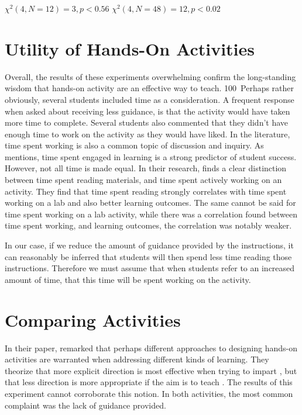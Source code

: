 






$\chi^2(4, N=12)=3, p<0.56$
$\chi^2(4, N=48)=12, p<0.02$






\section{Utility of Hands-On Activities}
    Overall, the results of these experiments overwhelming confirm the long-standing wisdom that hands-on activity are an effective way to teach. %
 100\    
    Perhaps rather obviously, several students included time as a consideration. %
A frequent response when asked about receiving less guidance, is that the activity would have taken more time to complete. %
Several students also commented that they didn't have enough time to work on the activity as they would have liked. %
In the literature, time spent working is also a common topic of discussion and inquiry. %
As \textcite{C-Linehan} mentions, time spent engaged in learning is a strong predictor of student success. %
However, not all time is made equal. In their research, \textcite{Z-Zeng} finds a clear distinction between time spent reading materials, and time spent actively working on an activity. %
They find that time spent reading strongly correlates with time spent working on a lab and also better learning outcomes. %
The same cannot be said for time spent working on a lab activity, while there was a correlation found between time spent working, and learning outcomes, the correlation was notably weaker. 
    
    In our case, if we reduce the amount of guidance provided by the instructions, it can reasonably be inferred that students will then spend less time reading those instructions. %
Therefore we must assume that when students refer to an increased amount of time, that this time will be spent working on the activity. 


\section{Comparing Activities}
    In their paper, \citeauthor{R-Weiss} remarked that perhaps different approaches to designing hands-on activities are warranted when addressing different kinds of learning. %
They theorize that more explicit direction is most effective when trying to impart \say{content knowledge}, but that less direction is more appropriate if the aim is to teach . %
The results of this experiment cannot corroborate this notion. %
In both activities, the most common complaint was the lack of guidance provided. 
    
